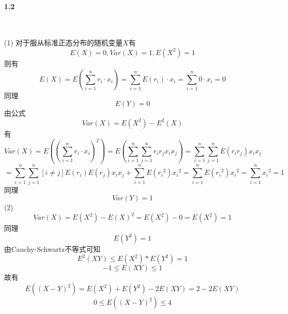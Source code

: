 \paragraph{1.2}~{}

(1)
对于服从标准正态分布的随机变量$X$有$$E(X)=0,Var(X)=1,E(X^2)=1$$则有
$$E(X)=E(\sum_{i=1}^{n}r_i\cdot x_i) = \sum_{i=1}^{n} E(r_i)\cdot x_i=\sum_{i=1}^{n}0\cdot x_i=0$$
同理 $$E(Y)=0$$
由公式$$Var(X)=E(X^2)-E^2(X)$$有
$$Var(X) = E((\sum_{i=1}^{n}r_i\cdot x_i)^2)=E(\sum_{i=1}^{n}\sum_{j=1}^{n}r_ir_jx_ix_j)=\sum_{i=1}^{n}\sum_{j=1}^{n}E(r_ir_j)x_ix_j$$
$$=\sum_{i=1}^{n}\sum_{j=1}^{n}[i \ne j]E(r_i)E(r_j)x_ix_j+\sum_{i=1}^{n}E({r_i}^2){x_i}^2=\sum_{i=1}^{n}E({r_i}^2){x_i}^2=\sum_{i=1}^{n}{x_i}^2=1$$
同理$$Var(Y)=1$$
(2)
$$Var(X)=E(X^2)-{E(X)}^2=E(X^2)-0=E(X^2)=1$$
同理$$E(Y^2)=1$$
由Cauchy-Schwartz不等式可知
$$E^2(XY) \le E(X^2)*E(Y^2) = 1$$
$$-1\le E(XY) \le 1$$
故有
$$E((X-Y)^2)=E(X^2)+E(Y^2)-2E(XY)=2-2E(XY)$$
$$0 \le E((X-Y)^2) \le 4$$